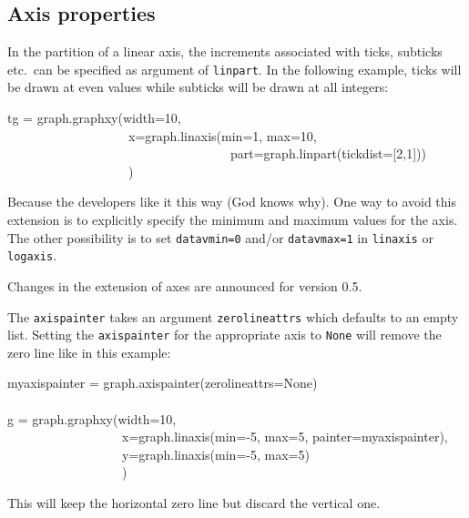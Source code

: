 \documentclass[11pt,DIV14]{scrartcl}
\begin{document}
{}
{}

{}
{
}

\subsection{Axis properties}

{}
{In the partition of a linear axis, the increments associated with ticks,
subticks etc.\ can be specified as argument of \texttt{linpart}. In the
following example, ticks will be drawn at even values while subticks will
be drawn at all integers:
\begin{progcode}
tg = graph.graphxy(width=10,\\
~~~~~~~~~~~~~~~~~~~x=graph.linaxis(min=1, max=10,\\
~~~~~~~~~~~~~~~~~~~~~~~~~~~~~~~~~~~part=graph.linpart(tickdist=[2,1]))\\
~~~~~~~~~~~~~~~~~~~)
\end{progcode}
}

{}
{Because the developers like it this way (God knows why). One way to avoid
this extension is to explicitly specify the minimum and maximum values for
the axis. The other possibility is to set \texttt{datavmin=0} and/or
\texttt{datavmax=1} in \texttt{linaxis} or \texttt{logaxis}. 

Changes in the extension of axes are announced for version 0.5.
}

{}
{\label{q:zerolineattrs}
The \texttt{axispainter} takes an argument \texttt{zerolineattrs} which 
defaults to an empty list. Setting the \texttt{axispainter} for the
appropriate axis to \texttt{None} will remove the zero line like in this
example:
\begin{progcode}
myaxispainter = graph.axispainter(zerolineattrs=None)\\
\\
g = graph.graphxy(width=10,\\
~~~~~~~~~~~~~~~~~~x=graph.linaxis(min=-5, max=5, painter=myaxispainter),\\
~~~~~~~~~~~~~~~~~~y=graph.linaxis(min=-5, max=5)\\
~~~~~~~~~~~~~~~~~~)
\end{progcode}
This will keep the horizontal zero line but discard the vertical one.
}
\end{document}
